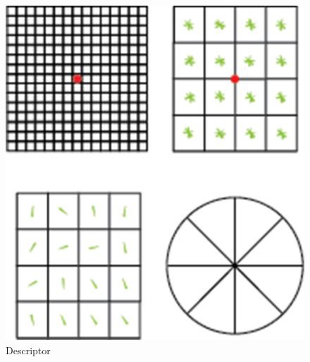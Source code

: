 	\begin{figure}[h]
			\centering
				\includegraphics[scale=0.5]{img/Descriptor.png}
			\caption{Descriptor }
	\end{figure}
		
 
 







